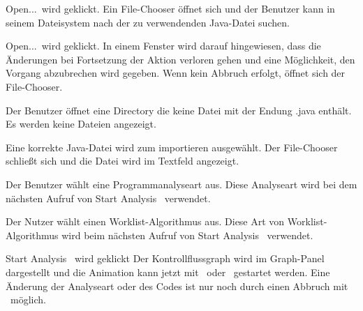 

{\glqq Open...\grqq\ wird geklickt.}
{Ein File-Chooser öffnet sich und der Benutzer kann in seinem Dateisystem nach der zu verwendenden Java-Datei suchen.}

{\glqq Open...\grqq\ wird geklickt.}
{In einem Fenster wird darauf hingewiesen, dass die Änderungen bei Fortsetzung der Aktion verloren gehen und eine Möglichkeit, den Vorgang abzubrechen wird gegeben. Wenn kein Abbruch erfolgt, öffnet sich der File-Chooser.}

{Der Benutzer öffnet eine Directory die keine Datei mit der Endung .java enthält.}
{Es werden keine Dateien angezeigt.}

{Eine korrekte Java-Datei wird zum importieren ausgewählt.}
{Der File-Chooser schließt sich und die Datei wird im Textfeld angezeigt.}



{Der Benutzer wählt eine Programmanalyseart aus.}
{Diese Analyseart wird bei dem nächsten Aufruf von \glqq Start Analysis \grqq\ verwendet.}

{Der Nutzer wählt einen Worklist-Algorithmus aus.}
{Diese Art von Worklist-Algorithmus wird beim nächsten Aufruf von \glqq Start Analysis \grqq\ verwendet.}



{\glqq Start Analysis \grqq\ wird geklickt}
{Der Kontrollflussgraph wird im Graph-Panel dargestellt und die Animation kann jetzt mit \faStepForward\ oder \faPlay\ gestartet werden. Eine Änderung der Analyseart oder des Codes ist nur noch durch einen Abbruch mit \faStop\  möglich.}

